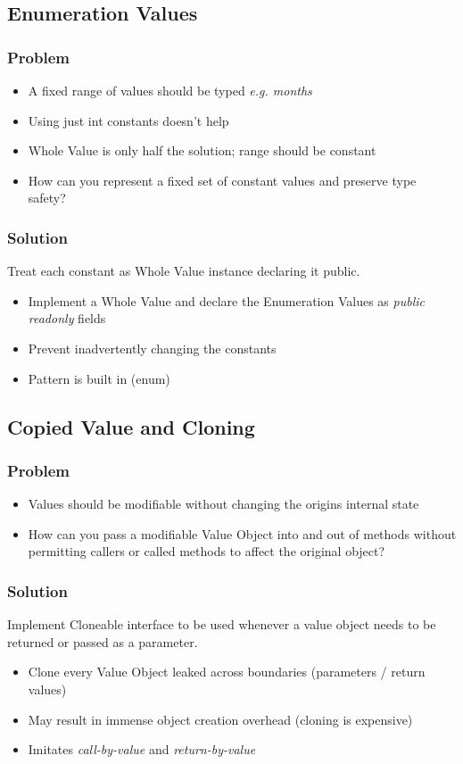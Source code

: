 \subsection{Enumeration Values}
\subsubsection{Problem}
\begin{itemize}
    \item A fixed range of values should be typed \textit{e.g. months}
    \item Using just int constants doesn't help
    \item Whole Value is only half the solution; range should be constant
    \item How can you represent a fixed set of constant values and preserve type safety?
\end{itemize}
\subsubsection{Solution}
Treat each constant as Whole Value instance declaring it public.
\begin{itemize}
    \item Implement a Whole Value and declare the Enumeration Values as \textit{public readonly} fields
    \item Prevent inadvertently changing the constants
    \item Pattern is built in (enum)
\end{itemize}

\subsection{Copied Value and Cloning}
\subsubsection{Problem}
\begin{itemize}
    \item Values should be modifiable without changing the origins internal state
    \item How can you pass a modifiable Value Object into and out of methods without permitting callers or called methods to affect the original object?
\end{itemize}
\subsubsection{Solution}
Implement Cloneable interface to be used whenever a value object needs to be returned or passed as a parameter.
\begin{itemize}
    \item Clone every Value Object leaked across boundaries (parameters / return values)
    \item May result in immense object creation overhead (cloning is expensive)
    \item Imitates \textit{call-by-value} and \textit{return-by-value}
\end{itemize}

